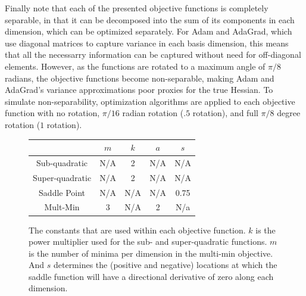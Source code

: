 \documentclass[letterpaper, 10 pt, conference]{IEEEtran}  %
\begin{document}
Finally note that each of the presented objective functions is
completely separable, in that it can be decomposed into the sum of its
components in each dimension, which can be optimized separately.  For
Adam and AdaGrad, which use diagonal matrices to capture variance in
each basis dimension, this means that all the necessarry information
can be captured without need for off-diagonal elements.  However, as
the functions are rotated to a maximum angle of $\pi / 8$ radians, the
objective functions become non-separable, making Adam and AdaGrad's
variance approximations poor proxies for the true Hessian.  To
simulate non-separability, optimization algorithms are applied to each
objective function with no rotation, $\pi / 16$ radian rotation ($.5$
rotation), and full $\pi / 8$ degree rotation ($1$ rotation).

\begin{figure}
  \centering
  \begin{tabular}{|c|c|c|c|c|}
    \hline
    & $m$ & $k$ & $a$ & $s$ \\
    \hline
    Sub-quadratic & N/A & 2 & N/A & N/A \\
    Super-quadratic & N/A & 2 & N/A & N/A \\
    Saddle Point & N/A & N/A & N/A & 0.75 \\
    Mult-Min & 3 & N/A & 2 & N/a \\
    \hline
  \end{tabular}
  \caption{The constants that are used within each objective function. $k$ is the power multiplier used for the sub- and super-quadratic functions. $m$ is the number of minima per dimension in the multi-min objective. And $s$ determines the (positive and negative) locations at which the saddle function will have a directional derivative of zero along each dimension.}
  \label{tab:const}
\end{figure}
\end{document}
